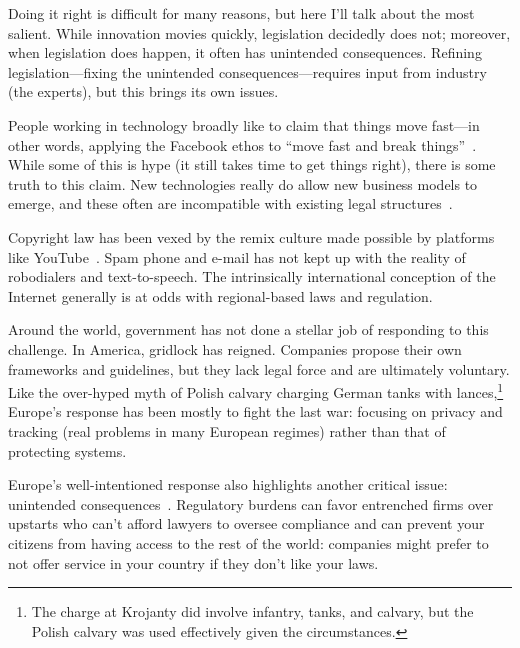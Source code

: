 Doing it right is difficult for many reasons, but here I'll talk about
the most salient.  While innovation movies quickly, legislation
decidedly does not; moreover, when legislation does happen, it often
has unintended consequences.  Refining legislation---fixing the
unintended consequences---requires input from industry (the experts),
but this brings its own issues.

People working in technology broadly like to claim that things move
fast---in other words, applying the Facebook ethos to ``move fast and break
  things''~\citep{vardi-18}.  While some of this is hype (it still takes time to get
things right), there is some truth to this claim.  New technologies
really do allow new business models to emerge, and these often are
incompatible with existing legal structures~\citep{nieuwland-18}.

Copyright law has been vexed by the remix culture made possible by
platforms like YouTube~\citep{lessig-08}.  Spam phone and e-mail has not kept up with
the reality of robodialers and text-to-speech.  The intrinsically
international conception of the Internet generally is at odds with
regional-based laws and regulation.


Around the world, government has not done a stellar job of responding
to this challenge.  In America, gridlock has reigned.  Companies
propose their own frameworks and guidelines, but they lack legal force
and are ultimately voluntary.  Like the over-hyped myth of Polish
calvary charging German tanks with lances,\footnote{The charge at
  Krojanty did involve infantry, tanks, and calvary, but the Polish
  calvary was used effectively given the circumstances.} Europe's response has been mostly to
fight the last war: focusing on privacy and tracking (real problems in
many European regimes) rather than that of protecting systems.

Europe's well-intentioned  response also highlights another
critical issue: unintended consequences~\citep{goodman-17}.  Regulatory burdens can favor
entrenched firms over upstarts who can't afford lawyers to oversee
compliance and can prevent your citizens from having access to the
rest of the world: companies might prefer to not offer service in
your country if they don't like your laws.

